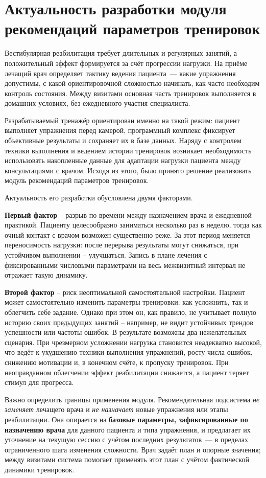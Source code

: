 \section{Актуальность разработки модуля рекомендаций параметров тренировок}

Вестибулярная реабилитация требует длительных и регулярных занятий, а положительный эффект
формируется за счёт прогрессии нагрузки. На приёме
лечащий врач определяет тактику ведения пациента~--- какие упражнения допустимы, с какой
ориентировочной сложностью начинать, как часто необходим контроль состояния. Между визитами
основная часть тренировок выполняется в домашних условиях, без ежедневного участия
специалиста.

Разрабатываемый тренажёр ориентирован именно на такой режим: пациент выполняет упражнения
перед камерой, программный комплекс фиксирует объективные результаты и сохраняет их в базе данных. Наряду с
контролем техники выполнения и ведением истории тренировок возникает необходимость
использовать накопленные данные для адаптации нагрузки пациента между консультациями с врачом. Исходя из этого, было принято решение реализовать модуль рекомендаций параметров тренировок.

Актуальность его разработки обусловлена двумя факторами.

\textbf{Первый фактор} -- разрыв по времени между назначением врача и ежедневной практикой. Пациенту целесообразно заниматься несколько раз в неделю, тогда как очный контакт с врачом возможен существенно реже. За этот период меняется переносимость нагрузки: после перерыва результаты могут снижаться, при устойчивом выполнении -- улучшаться. Запись в плане лечения с фиксированными числовыми параметрами на весь межвизитный интервал не отражает такую динамику.

\textbf{Второй фактор} -- риск неоптимальной самостоятельной настройки. Пациент может самостоятельно изменить параметры тренировки: как усложнить, так и облегчить себе задание. Однако при этом он, как правило, не учитывает полную историю своих предыдущих занятий -- например, не видит устойчивых трендов успешности или частоты ошибок. В результате возможны два нежелательных сценария. При чрезмерном усложнении нагрузка становится неадекватно высокой, что ведёт к ухудшению техники выполнения упражнений, росту числа ошибок, снижению мотивации и, в конечном счёте, к пропуску тренировок. При неоправданном облегчении эффект реабилитации снижается, а пациент теряет стимул для прогресса.

Важно определить границы применения модуля. Рекомендательная подсистема \emph{не заменяет}
лечащего врача и \emph{не назначает} новые упражнения или этапы реабилитации. Она опирается
на \textbf{базовые параметры, зафиксированные по назначению врача} для данного пациента и
типа упражнения, и предлагает их уточнение на текущую сессию с учётом последних
результатов~--- в пределах ограниченного шага изменения сложности. Врач задаёт план и
опорные значения; между визитами система помогает применять этот план с учётом
фактической динамики тренировок.

